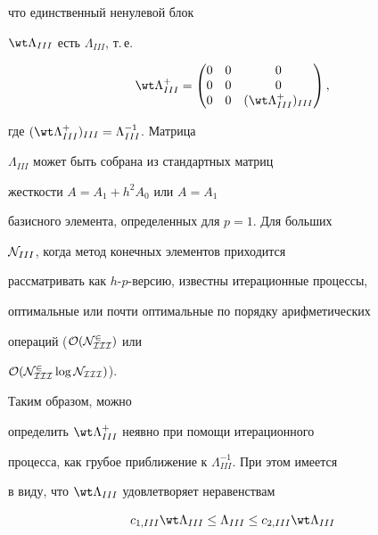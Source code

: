 что единственный ненулевой блок 


$\wt \Lambda_{III}$ есть $\Lambda_{III}$, т.\,е.


\begin{equation}


\wt \Lambda_{III}^+=


\begin{pmatrix}


0& 0 & 0 \\


0& 0 & 0 \\


0 & 0 & (\wt \Lambda_{III}^+)_{III}


\end{pmatrix}


,


\label{5.33} 


\end{equation}


где $(\wt \Lambda_{III}^+)_{III}=\Lambda_{III}^{-1}$. Матрица 


$\Lambda_{III}$ может быть собрана из стандартных матриц


жесткости $A=A_1+h^2 A_0$ или $A=A_1$


базисного элемента, определенных для $p=1$. Для больших 


${\cal N}_{III}$, когда метод конечных элементов приходится 


рассматривать как $h$-$p$-версию, известны итерационные процессы, 


оптимальные или почти оптимальные по порядку арифметических 


операций ($\cal O(\cal N_{III}^2)$ или


$\cal O(\cal N_{III}^2\log \cal N_{III})$).


Таким образом, можно


определить $\wt \Lambda^+_{III}$ неявно при помощи итерационного 


процесса, как грубое приближение к $\Lambda^{-1}_{III}$. При этом имеется 


в виду, что $\wt \Lambda_{III}$ удовлетворяет неравенствам


\begin{equation}


c_{1,III}\wt \Lambda_{III} \leq \Lambda_{III}


\leq c_{2,III}\wt \Lambda_{III}


\label{5.8} 


\end{equation}


